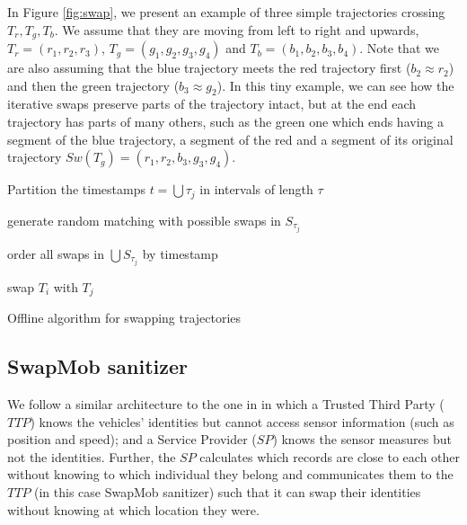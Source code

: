 \documentclass[review]{elsarticle}
\begin{document}
In Figure \ref{fig:swap}, we present an example of three simple trajectories crossing $T_r, T_g, T_b$. We assume that they are moving from left to right and upwards, $T_r = (r_1, r_2, r_3)$, $T_g = (g_1, g_2, g_3, g_4)$ and $T_b = (b_1, b_2, b_3, b_4)$. Note that we are also assuming that the blue trajectory meets the red trajectory first ($b_2 \approx r_2$) and then the green trajectory ($b_3 \approx g_2$). In this tiny example, we can see how the iterative swaps preserve parts of the trajectory intact, but at the end each trajectory has parts of many others, such as the green one which ends having a segment of the blue trajectory, a segment of the red and a segment of its original trajectory $Sw(T_g)=(r_1, r_2, b_3, g_3, g_4)$.


\begin{algorithm}[t]
\SetAlgoNoLine
{}

Partition the timestamps $t =\bigcup \tau_j$ in intervals of length $\tau$

generate random matching with possible swaps in $S_{\tau_j}$\

order all swaps in $\bigcup S_{\tau_j}$ by timestamp\

{swap $T_i$ with $T_j$}

\caption{Offline algorithm for swapping trajectories}
\label{alg:one}
\end{algorithm}


\subsection{SwapMob sanitizer}

We follow a similar architecture to the one in \cite{Hoh06} in which a Trusted Third Party ($TTP$) knows the
vehicles' identities but cannot access sensor information (such as position and  speed); and a Service Provider ($SP$) knows the sensor measures but not the identities.
Further, the $SP$ calculates which records are close to each other without knowing to which individual they belong and communicates them to the $TTP$ (in this case SwapMob sanitizer) such that it can swap their identities without knowing at which location they were.
\end{document}

